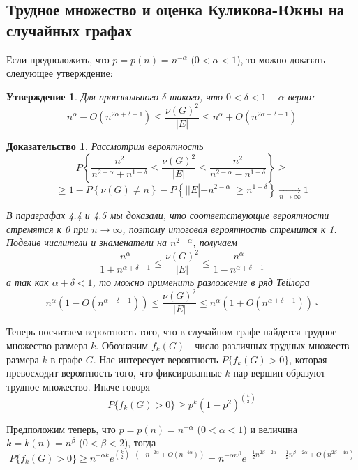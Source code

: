 \documentclass[a4paper]{article}
\newtheorem*{msolution}{Доказательство}
\newtheorem{mclaim}{Утверждение}[section]
\begin{document}
\subsection{Трудное множество и оценка Куликова-Юкны на случайных графах}

Если предположить, что $p = p(n) = n^{-\alpha}$ ($0 < \alpha < 1$), то можно доказать следующее утверждение:
\begin{mclaim}
	Для произвольного $\delta$ такого, что $0 < \delta < 1 - \alpha$  верно:
    $$n^{\alpha} - O(n^{2\alpha + \delta - 1}) \leq \frac{\nu(G)^2}{|E|} \leq n^{\alpha} + O(n^{2\alpha + \delta - 1})$$
\end{mclaim}

\begin{msolution}
   Рассмотрим вероятность 
   $$P\left\{\frac{n^2}{n^{2-\alpha} + n^{1+\delta}} \leq \frac{\nu(G)^2}{|E|} \leq \frac{n^2}{n^{2-\alpha} - n^{1+\delta}} \right\}
    \geq $$ $$ \geq 1 - P\left\{\nu(G) \neq n\right\} - P\left\{||E| - n^{2-\alpha}| \geq
n^{1+\delta}\right\} \xrightarrow[n \to \infty]{} 1$$

В параграфах 4.4 и 4.5 мы доказали, что соответствующие вероятности стремятся к 0 при $n \to \infty$, 
поэтому итоговая вероятность стремится к 1. Поделив числители и знаменатели на $n^{2-\alpha}$, получаем 
$$\frac{n^{\alpha}}{1 + n^{\alpha + \delta - 1}} \leq \frac{\nu(G)^2}{|E|} \leq \frac{n^{\alpha}}{1 - n^{\alpha + \delta - 1}}$$
а так как $\alpha + \delta < 1$, то можно применить разложение в ряд Тейлора
$$n^{\alpha}\left(1 - O(n^{\alpha + \delta - 1})\right) \leq \frac{\nu(G)^2}{|E|} \leq n^{\alpha}\left(1 + O(n^{\alpha + \delta - 1})\right)\ \square$$
\end{msolution}

Теперь посчитаем вероятность того, что в случайном графе найдется трудное множество размера $k$. 
Обозначим $f_k(G)$ - число различных трудных множеств размера $k$ в графе $G$. Нас интересует 
вероятность $P\{f_k(G) > 0\}$, которая превосходит вероятность того, что фиксированные $k$ пар 
вершин образуют трудное множество. Иначе говоря $$P\{f_k(G) > 0\} \geq p^k\left(1-p^2\right)^{\binom{k}{2}}$$

Предположим теперь, что $p = p(n) = n^{-\alpha}$ ($0 < \alpha < 1$) и величина $k = k(n) = n^{\beta}$ ($0 < \beta < 2$), тогда $$P\{f_k(G) > 0\} \geq 
n^{-\alpha k}e^{\binom{k}{2}\cdot(-n^{-2\alpha} + O(n^{-4\alpha}))} = n^{-\alpha n^{\beta}} 
e^{-\frac{1}{2}n^{2\beta-2\alpha} + \frac{1}{2}n^{\beta - 2\alpha} + O(n^{2\beta - 4\alpha})}$$
\end{document}
